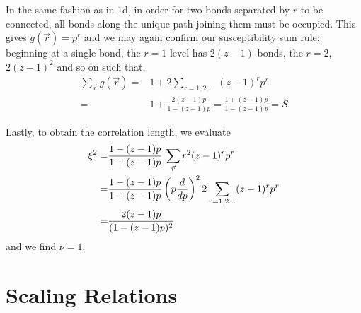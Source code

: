 In the same fashion as in 1d, in order
for two bonds separated by $r$ to be connected, all bonds along the unique path
joining them must be occupied.  This gives $g(\vec{r}) = p^r$ and we may again
confirm our susceptibility sum rule: beginning at a single
bond, the $r=1$ level has $2(z-1)$ bonds, the $r=2$, $2(z-1)^2$ and so on such that,
\begin{align*}
\sum_{\vec{r}}g(\vec{r}) =& 1 + 2 \sum_{r=1,2,...} (z-1)^r p^r \\
=& 1 + \frac{2(z-1)p}{1 - (z-1)p} = \frac{1 + (z-1)p}{1 - (z-1)p} = S
\end{align*}

Lastly, to obtain the correlation length, we evaluate
\begin{align*}
\xi^2 =& \frac{1-(z-1)p}{1+(z-1)p}\:\sum_{\vec{r}}r^2(z-1)^rp^r \\
=& \frac{1-(z-1)p}{1+(z-1)p}\left(p\frac{d }{d p}\right)^2 2\sum_{r=1,2...}(z-1)^rp^r \\
=& \frac{2(z-1)p}{(1-(z-1)p)^2}
\end{align*}
and we find $\nu = 1$.
\section{Scaling Relations}

